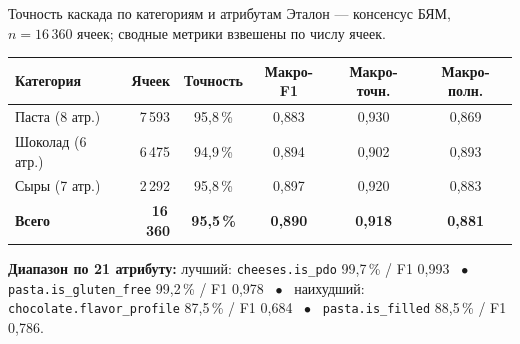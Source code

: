 \documentclass[aspectratio=169, 14pt]{beamer}
\newcommand{\pos}[1]{{\color{posgreen}#1}}
\begin{document}
\begin{frame}{Точность каскада по категориям и атрибутам}
\fontsize{9.5pt}{11.5pt}\selectfont
Эталон — консенсус БЯМ, $n=16\,360$ ячеек; сводные метрики взвешены по числу ячеек.

\vspace{0.3em}
\centering
\fontsize{10pt}{12pt}\selectfont
\setlength{\tabcolsep}{7pt}
\renewcommand{\arraystretch}{1.18}
\begin{tabular}{lrcccc}
\toprule
\textbf{Категория} & \textbf{Ячеек} & \textbf{Точность} & \textbf{Макро-F1} & \textbf{Макро-точн.} & \textbf{Макро-полн.} \\
\midrule
Паста (8 атр.)     & 7\,593 & 95{,}8\,\% & 0{,}883 & 0{,}930 & 0{,}869 \\
Шоколад (6 атр.)   & 6\,475 & 94{,}9\,\% & 0{,}894 & 0{,}902 & 0{,}893 \\
Сыры (7 атр.)      & 2\,292 & 95{,}8\,\% & 0{,}897 & 0{,}920 & 0{,}883 \\
\midrule
\rowcolor{green!10}
\textbf{Всего}     & \textbf{16\,360} & \textbf{95{,}5\,\%} & \textbf{0{,}890} & \textbf{0{,}918} & \textbf{0{,}881} \\
\bottomrule
\end{tabular}

\vspace{0.55em}
\fontsize{9pt}{11pt}\selectfont
\textbf{Диапазон по 21 атрибуту:}
\pos{лучший: \texttt{cheeses.is\_pdo}} 99{,}7\,\% / F1 0{,}993 ~$\bullet$~
\pos{\texttt{pasta.is\_gluten\_free}} 99{,}2\,\% / F1 0{,}978 ~$\bullet$~
\textcolor{red!75!black}{наихудший: \texttt{chocolate.flavor\_profile}} 87{,}5\,\% / F1 0{,}684 ~$\bullet$~
\textcolor{red!75!black}{\texttt{pasta.is\_filled}} 88{,}5\,\% / F1 0{,}786.

\end{frame}
\end{document}

